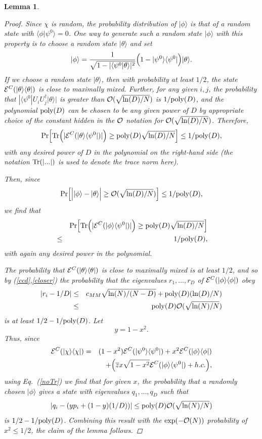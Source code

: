 \documentclass[aps,prl,amsmath,amssymb,amsfonts,superscriptaddress,floatfix]{revtex4}
\newtheorem{lemma}{Lemma}
\newcommand{\cmm}{c_{MM}}
\newcommand{\conc}{{\cal E}^C}
\newcommand{\be}{\begin{equation}}
\newcommand{\ee}{\end{equation}}
\begin{document}
\begin{lemma}
\begin{proof}
Since $\chi$ is random,
the probability distribution of $|\phi\rangle$ is that of a random state with
$\langle \phi|\psi^0 \rangle=0$.  One way to generate such a random state $|\phi\rangle$
with this property is to choose a random state $|\theta\rangle$ and set
\be
|\phi\rangle=\frac{1}{\sqrt{1-|\langle\psi^0|\theta\rangle|^2}}
\Bigl( 1-|\psi^0\rangle\langle\psi^0| \Bigr) |\theta\rangle.
\ee
If we choose a random state $|\theta\rangle$,
then with probability at least $1/2$, the state $\conc(|\theta\rangle\langle\theta|)$ is
close to maximally mixed.  Further, for any given $i,j$,
the probability that $|\langle \psi^0|U_i U_j^{\dagger} |\theta\rangle|$ is greater than
${\cal O}(\sqrt{\ln(D)/N})$ is $1/{\rm poly}(D)$, and the polynomial
${\rm poly}(D)$ can be chosen to be any given power of $D$ by appropriate choice of the
constant hidden in the ${\cal O}$ notation for
${\cal O}(\sqrt{\ln(D)/N})$.
Therefore,
\be
\label{smalltrCross}
{\rm Pr}\Bigl[{\rm Tr}\Bigl(|\conc(|\theta\rangle\langle\psi^0|)|\Bigr) \geq {\rm poly}(D)
\sqrt{\ln(D)/N}\Bigr] \leq 1/{\rm poly}(D),
\ee
with any desired power of $D$ in
the polynomial on the right-hand side (the notation ${\rm Tr}(|...|)$ is
used to denote the trace norm here).

Then, since 
\be
\label{closer}
{\rm Pr}\Bigl[\Bigl||\phi\rangle-|\theta\rangle\Bigr|\geq
{\cal O}(\sqrt{\ln(D)/N})\Bigr]\leq 1/{\rm poly}(D),
\ee
we find that
\begin{eqnarray}
\label{noTr}
&& {\rm Pr}\Bigl[{\rm Tr}\Bigl(|\conc(|\phi\rangle\langle\psi^0|)|\Bigr) 
\geq 
 {\rm poly}(D)
\sqrt{\ln(D)/N}\Bigr] 
\nonumber \\
&\leq & 1/{\rm poly}(D),
\end{eqnarray}
with again any desired power in the polynomial.

The probability that 
$\conc(|\theta\rangle\langle\theta|)$ is close to maximally mixed is
at least $1/2$, and so by (\ref{ccd},\ref{closer}) the probability that
the eigenvalues $r_1,...,r_D$
of $\conc(|\phi\rangle\langle\phi|)$ obey
\begin{eqnarray}
|r_i-1/D|& \leq &
\cmm \sqrt{\ln(N)/(N-D)}+{\rm poly}(D)(\ln(D)/N) \nonumber \\
&\leq & {\rm poly}(D) {\cal O}(\sqrt{\ln(N)/N})
\end{eqnarray}
is at least $1/2-1/{\rm poly}(D)$.
Let
\be
y=1-x^2.
\ee
Thus,
since
\begin{eqnarray}
\conc(|\chi\rangle\langle\chi|)&=&(1-x^2) \conc(|\psi^0\rangle\langle\psi^0|) + x^2 
\conc(|\phi\rangle\langle\phi|)\\ \nonumber
&&+ \Bigl(\overline z x\sqrt{1-x^2} \conc(|\phi\rangle\langle\psi^0|)+h.c.\Bigr),
\end{eqnarray}
using Eq.~(\ref{noTr})
we find that for given $x$, 
the probability that
a randomly chosen $|\phi\rangle$ gives a state with
eigenvalues
$q_1,...,q_D$ such that
\be
\label{aeq}
|q_i-(yp_i+(1-y)(1/D))|\leq 
{\rm poly}(D)
{\cal O}(\sqrt{\ln(N)/N})
\ee
is $1/2-1/{\rm poly}(D)$.  Combining this result with the $\exp(-{\cal O}(N))$
probability of $x^2\leq 1/2$, the claim of the lemma follows.
\end{proof}
\end{lemma}
\end{document}
